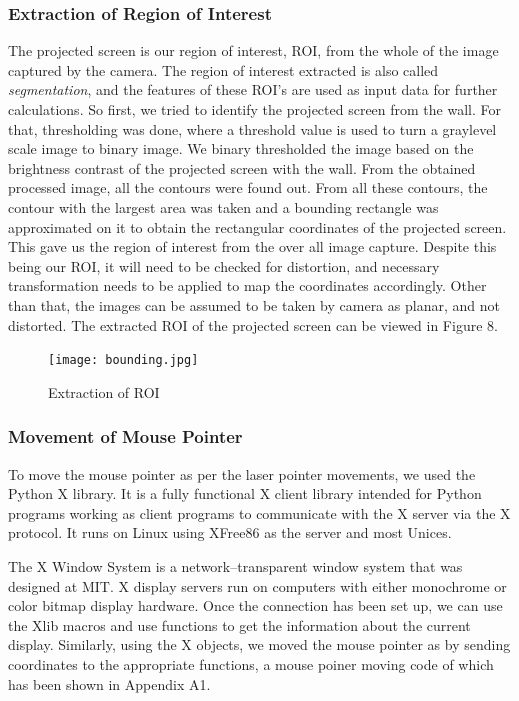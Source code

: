 \documentclass[12pt, a4paper]{article}
\begin{document}
\subsubsection{Extraction of Region of Interest}

The projected screen is our region of interest, ROI, from the whole of the image captured by the camera. The region of interest extracted is also called \emph{segmentation}, and the features of these ROI's are used as input data for further calculations. So first, we tried to identify the projected screen from the wall. For that, thresholding was done, where a threshold value is used to turn a graylevel scale image to binary image. We binary thresholded the image based on the brightness contrast of the projected screen with the wall. From the obtained processed image, all the contours were found out. From all these contours, the contour with the largest area was taken and a bounding rectangle was approximated on it to obtain the rectangular coordinates of the projected screen. This gave us the region of interest from the over all image capture. Despite this being our ROI, it will need to be checked for distortion, and necessary transformation needs to be applied to map the coordinates accordingly. Other than that, the images can be assumed to be taken by camera as planar, and not distorted. The extracted ROI of the projected screen can be viewed in Figure 8.

\begin{figure}[htp]
\centering
\texttt{[image: bounding.jpg]}
\caption{Extraction of ROI}
\label{}
\end{figure}

\subsubsection{Movement of Mouse Pointer}
To move the mouse pointer as per the laser pointer movements, we used the Python X library. It is a fully functional X client library intended for Python programs working as client programs to communicate with the X server via the X protocol. It runs on Linux using XFree86 as the server and most Unices.

The X Window System is a network--transparent window system that was designed at MIT. X display servers run on computers with either monochrome or color bitmap display hardware. Once the connection has been set up, we can use the Xlib macros and use functions to get the information about the current display. Similarly, using the X objects, we moved the mouse pointer as by sending coordinates to the appropriate functions, a mouse poiner moving code of which has been shown in Appendix A1.
\end{document}
